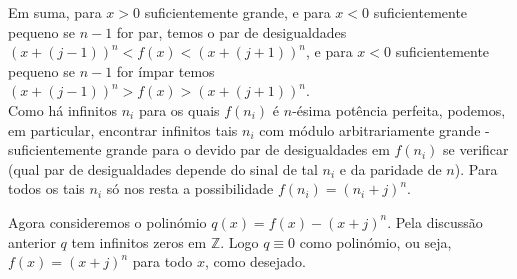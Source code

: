 \documentclass[repertorio-solutions-1.tex]{subfiles}
\begin{document}
\begin{solution}
Em suma, para $x>0$ suficientemente grande,
e para $x<0$ suficientemente pequeno se $n-1$ for par, temos
o par de desigualdades
$(x+(j-1))^n<f(x)<(x+(j+1))^n$,
e para $x<0$ suficientemente pequeno se $n-1$ for ímpar temos
$(x+(j-1))^n>f(x)>(x+(j+1))^n$.
\\

Como há infinitos $n_i$ para os quais $f(n_i)$ é $n$-ésima potência perfeita,
podemos, em particular, encontrar infinitos tais $n_i$ com módulo arbitrariamente
grande - suficientemente grande para o devido par de desigualdades em
$f(n_i)$ se verificar (qual par de desigualdades depende do sinal de tal $n_i$
e da paridade de $n$). Para todos os tais $n_i$ só nos resta a possibilidade
$f(n_i)=(n_i+j)^n$.

Agora consideremos o polinómio $q(x)=f(x)-(x+j)^n$. Pela discussão anterior $q$
tem infinitos zeros em $\mathbb{Z}$.
Logo $q\equiv 0$ como polinómio, ou seja, $f(x)=(x+j)^n$ para todo $x$,
como desejado.
\end{solution}
\end{document}
